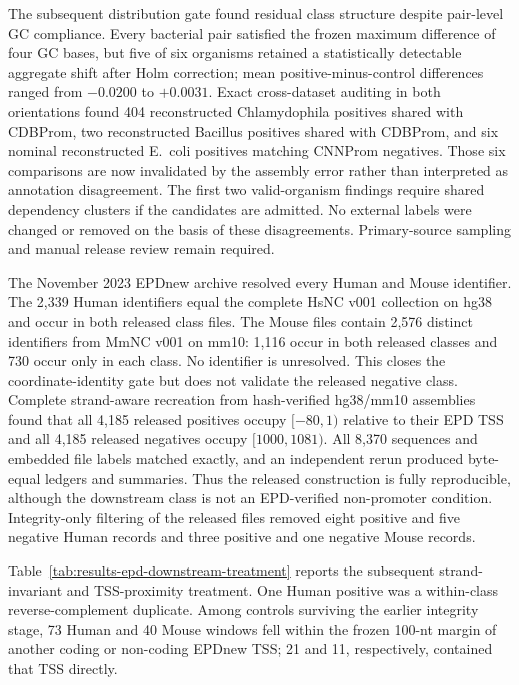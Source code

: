 The subsequent distribution gate found residual class structure despite
pair-level GC compliance. Every bacterial pair satisfied the frozen maximum
difference of four GC bases, but five of six organisms retained a statistically
detectable aggregate shift after Holm correction; mean positive-minus-control
differences ranged from $-0.0200$ to $+0.0031$. Exact cross-dataset auditing in
both orientations found 404 reconstructed Chlamydophila positives shared with
CDBProm, two reconstructed Bacillus positives shared with CDBProm, and six
nominal reconstructed E.~coli positives matching CNNProm negatives. Those six
comparisons are now invalidated by the assembly error rather than interpreted
as annotation disagreement. The first two valid-organism findings require
shared dependency clusters if the candidates are admitted. No external labels
were changed or removed on the basis of these disagreements. Primary-source
sampling and manual release review remain required.

The November 2023 EPDnew archive resolved every Human and Mouse identifier.
The 2,339 Human identifiers equal the complete HsNC v001 collection on hg38 and
occur in both released class files. The Mouse files contain 2,576 distinct
identifiers from MmNC v001 on mm10: 1,116 occur in both released classes and
730 occur only in each class. No identifier is unresolved. This closes the
coordinate-identity gate but does not validate the released negative class.
Complete strand-aware recreation from hash-verified hg38/mm10
assemblies found that all 4,185 released positives occupy $[-80,1)$ relative
to their EPD TSS and all 4,185 released negatives occupy $[1000,1081)$. All
8,370 sequences and embedded file labels matched exactly, and an independent
rerun produced byte-equal ledgers and summaries. Thus the released construction
is fully reproducible, although the downstream class is not an EPD-verified
non-promoter condition. Integrity-only filtering of the released files removed eight positive
and five negative Human records and three positive and one negative Mouse
records.

Table~\ref{tab:results-epd-downstream-treatment} reports the subsequent
strand-invariant and TSS-proximity treatment. One Human positive was a
within-class reverse-complement duplicate. Among controls surviving the earlier
integrity stage, 73 Human and 40 Mouse windows fell within the frozen 100-nt
margin of another coding or non-coding EPDnew TSS; 21 and 11, respectively,
contained that TSS directly.

